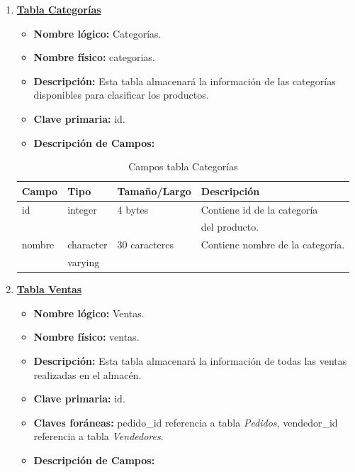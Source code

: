 \documentclass[letterpaper,12pt]{article}
\begin{document}
\begin{enumerate}
\newpage

\item \textbf{\underline{Tabla Categorías}}
\begin{itemize}
\item \textbf{Nombre lógico:} Categorías.
\item \textbf{Nombre físico:} categorias.
\item \textbf{Descripción:} Esta tabla almacenará la información de las categorías disponibles para clasificar los productos.
\item \textbf{Clave primaria:} id.
\item\textbf{Descripción de Campos:}
\end{itemize}

\begin{table}[!ht]
\caption{Campos tabla Categorías}
\begin{center}
\begin{tabular}{|l|l|l|l|}
\hline
\textbf{Campo} \hspace*{2cm} & \textbf{Tipo} & \textbf{Tamaño/Largo} & \textbf{Descripción} \hspace*{3,5cm} \\
\hline

id& integer & 4 bytes&Contiene id de la categoría\\
\mbox{} & \mbox{} & &del producto.\\
\hline

nombre & character & 30 caracteres&Contiene nombre de la categoría.\\
& varying & & \\
\hline

\end{tabular}
\end{center}
\end{table}

\newpage

\item \textbf{\underline{Tabla Ventas}}
\begin{itemize}
\item \textbf{Nombre lógico:} Ventas.
\item \textbf{Nombre físico:} ventas.
\item \textbf{Descripción:} Esta tabla almacenará la información de todas las ventas realizadas en el almacén.
\item \textbf{Clave primaria:} id.
\item \textbf{Claves foráneas:} pedido\_id referencia a tabla \emph{Pedidos}, vendedor\_id referencia a tabla \emph{Vendedores}.
\item\textbf{Descripción de Campos:}
\end{itemize}


\end{enumerate}
\end{document}
